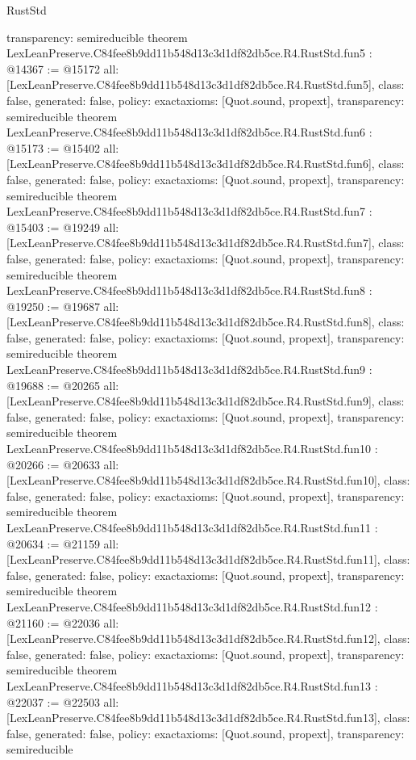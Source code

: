 \begin{lexlean}{RustStd}
\begin{coremodule}
{  transparency: semireducible
}
theorem LexLeanPreserve.C84fee8b9dd11b548d13c3d1df82db5ce.R4.RustStd.fun5 : @14367 := @15172 {
  all: [LexLeanPreserve.C84fee8b9dd11b548d13c3d1df82db5ce.R4.RustStd.fun5],
  class: false,
  generated: false,
  policy: exact{axioms: [Quot.sound, propext]},
  transparency: semireducible
}
theorem LexLeanPreserve.C84fee8b9dd11b548d13c3d1df82db5ce.R4.RustStd.fun6 : @15173 := @15402 {
  all: [LexLeanPreserve.C84fee8b9dd11b548d13c3d1df82db5ce.R4.RustStd.fun6],
  class: false,
  generated: false,
  policy: exact{axioms: [Quot.sound, propext]},
  transparency: semireducible
}
theorem LexLeanPreserve.C84fee8b9dd11b548d13c3d1df82db5ce.R4.RustStd.fun7 : @15403 := @19249 {
  all: [LexLeanPreserve.C84fee8b9dd11b548d13c3d1df82db5ce.R4.RustStd.fun7],
  class: false,
  generated: false,
  policy: exact{axioms: [Quot.sound, propext]},
  transparency: semireducible
}
theorem LexLeanPreserve.C84fee8b9dd11b548d13c3d1df82db5ce.R4.RustStd.fun8 : @19250 := @19687 {
  all: [LexLeanPreserve.C84fee8b9dd11b548d13c3d1df82db5ce.R4.RustStd.fun8],
  class: false,
  generated: false,
  policy: exact{axioms: [Quot.sound, propext]},
  transparency: semireducible
}
theorem LexLeanPreserve.C84fee8b9dd11b548d13c3d1df82db5ce.R4.RustStd.fun9 : @19688 := @20265 {
  all: [LexLeanPreserve.C84fee8b9dd11b548d13c3d1df82db5ce.R4.RustStd.fun9],
  class: false,
  generated: false,
  policy: exact{axioms: [Quot.sound, propext]},
  transparency: semireducible
}
theorem LexLeanPreserve.C84fee8b9dd11b548d13c3d1df82db5ce.R4.RustStd.fun10 : @20266 := @20633 {
  all: [LexLeanPreserve.C84fee8b9dd11b548d13c3d1df82db5ce.R4.RustStd.fun10],
  class: false,
  generated: false,
  policy: exact{axioms: [Quot.sound, propext]},
  transparency: semireducible
}
theorem LexLeanPreserve.C84fee8b9dd11b548d13c3d1df82db5ce.R4.RustStd.fun11 : @20634 := @21159 {
  all: [LexLeanPreserve.C84fee8b9dd11b548d13c3d1df82db5ce.R4.RustStd.fun11],
  class: false,
  generated: false,
  policy: exact{axioms: [Quot.sound, propext]},
  transparency: semireducible
}
theorem LexLeanPreserve.C84fee8b9dd11b548d13c3d1df82db5ce.R4.RustStd.fun12 : @21160 := @22036 {
  all: [LexLeanPreserve.C84fee8b9dd11b548d13c3d1df82db5ce.R4.RustStd.fun12],
  class: false,
  generated: false,
  policy: exact{axioms: [Quot.sound, propext]},
  transparency: semireducible
}
theorem LexLeanPreserve.C84fee8b9dd11b548d13c3d1df82db5ce.R4.RustStd.fun13 : @22037 := @22503 {
  all: [LexLeanPreserve.C84fee8b9dd11b548d13c3d1df82db5ce.R4.RustStd.fun13],
  class: false,
  generated: false,
  policy: exact{axioms: [Quot.sound, propext]},
  transparency: semireducible
}
\end{coremodule}
\end{lexlean}
